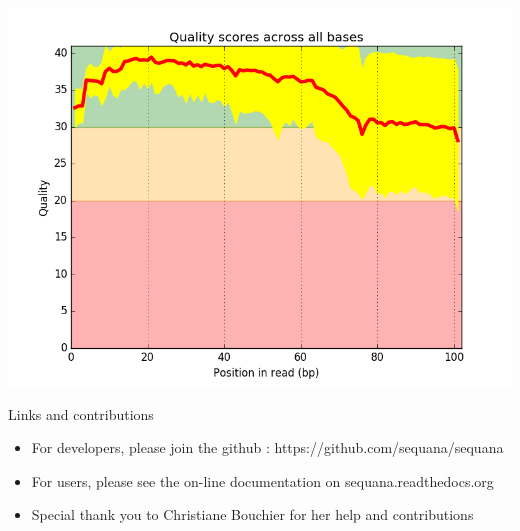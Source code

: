 \documentclass{beamer}
\begin{document}
\begin{frame}
\begin{columns}
\begin{column}{0.5\textwidth}
  \includegraphics[scale=0.15]{fastqc}

  
  \begin{block}{\tiny Links and contributions}
    \tiny
    \begin{itemize}
      \item For developers, please join the github  : https://github.com/sequana/sequana    
      \item For users, please see the on-line documentation on sequana.readthedocs.org
      \item Special thank you to Christiane Bouchier for her help and contributions
    \end{itemize}
  \end{block}
\end{column}
\end{columns}



\end{frame}
\end{document}
